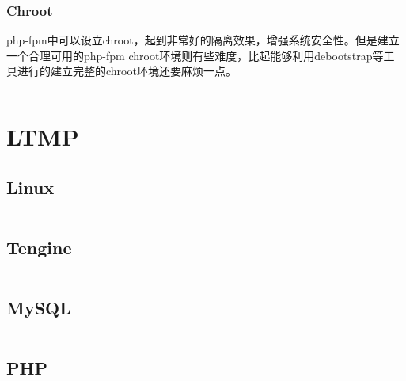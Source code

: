 \subsection{Chroot}




php-fpm中可以设立chroot，起到非常好的隔离效果，增强系统安全性。但是建立一个合理可用的php-fpm chroot环境则有些难度，比起能够利用debootstrap等工具进行的建立完整的chroot环境还要麻烦一点。




\begin{lstlisting}[language=bash]

\end{lstlisting}



\chapter{LTMP}



\section{Linux}



\begin{lstlisting}[language=bash]

\end{lstlisting}


\section{Tengine}


\begin{lstlisting}[language=bash]

\end{lstlisting}


\section{MySQL}


\begin{lstlisting}[language=bash]

\end{lstlisting}




\section{PHP}


